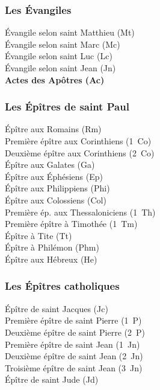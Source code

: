 \documentclass [11pt]{article}
\begin{document}
		\subsubsection*{Les Évangiles}
		
		\noindent Évangile selon saint Matthieu (Mt)\\
		Évangile selon saint Marc (Mc)\\
		Évangile selon saint Luc (Lc)\\
		Évangile selon saint Jean (Jn)\\
		
		\noindent \textbf{Actes des Apôtres (Ac)}
		
		
		\subsubsection*{Les Épîtres de saint Paul}
		
			\begin{multicols}{2}
			
			\small

			\noindent Épître  aux Romains (Rm)\\
			Première épître  aux Corinthiens (1~Co)\\
			Deuxième épître  aux Corinthiens (2~Co)\\
			Épître  aux Galates (Ga)\\
			Épître  aux Éphésiens (Ep)\\
			Épître  aux Philippiens (Phi)\\
			Épître  aux Colossiens (Col)\\
			Première ép.  aux Thessaloniciens (1~Th)\\
			Première épître à Timothée (1~Tm)\\
			Épître  à Tite (Tt)\\
			Épître  à Philémon (Phm)\\
			Épître  aux Hébreux (He)
			\normalsize
			\end{multicols}
		
			\pagebreak
			
		\subsubsection*{Les Épîtres catholiques}
			\begin{multicols}{2}
			\noindent Épître de saint Jacques (Jc)\\
			Première épître de saint Pierre (1~P)\\
			Deuxième épître de saint Pierre (2~P)\\
			Première épître de saint Jean (1~Jn)\\
			Deuxième épître de saint Jean (2~Jn)\\
			Troisième épître de saint Jean (3~Jn)\\
			Épître de saint Jude (Jd)\\
			\end{multicols}
				
\end{document}

